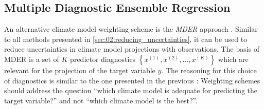 \subsection{Multiple Diagnostic Ensemble Regression}
\label{subsec:02:mder}

An alternative climate model weighting scheme is the \emph{\ac{MDER}} approach
\autocite{Karpechko2013}. Similar to all methods presented in
\cref{sec:02:reducing_uncertainties}, it can be used to reduce uncertainties in
climate model projections with observations. The basis of \ac{MDER} is a set of
$K$ predictor diagnostics $\left\{ x^{(1)}, x^{(2)}, \ldots, x^{(K)} \right\}$
which are relevant for the projection of the target variable $y$. The reasoning
for this choice of diagnostics is similar to the one presented in the previous
: Weighting schemes should address the
question \enquote{which climate model is adequate for predicting the target
  variable?} and not \enquote{which climate model is the best?}.

